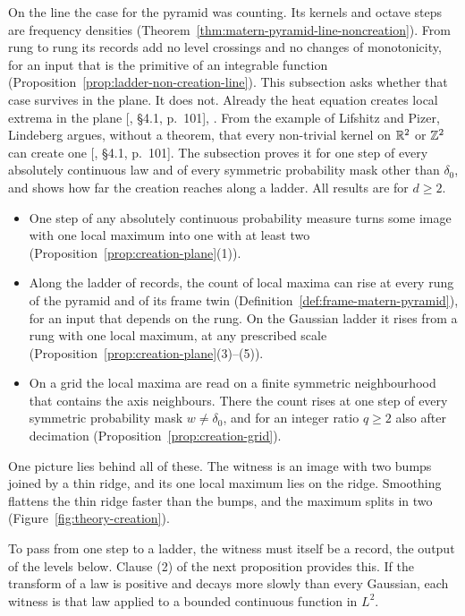 On the line the case for the \Matern{} pyramid was counting. Its kernels and octave steps are
\Polya{} frequency densities (Theorem~\ref{thm:matern-pyramid-line-noncreation}). From rung to rung
its records add no level crossings and no changes of monotonicity, for an input that is the
primitive of an integrable function (Proposition~\ref{prop:ladder-non-creation-line}). This
subsection asks whether that case survives in the plane. It does not. Already the heat equation
creates local extrema in the plane [, \S 4.1, p.~101],
. From the example of Lifshitz and Pizer, Lindeberg argues,
without a theorem, that every non-trivial kernel on $\mathbb{R}^2$ or $\mathbb{Z}^2$ can create one
[, \S 4.1, p.~101]. The subsection proves it for one step of every
absolutely continuous law and of every symmetric probability mask other than $\delta_0$, and shows
how far the creation reaches along a ladder. All results are for $d \ge 2$.
\begin{itemize}
\item One step of any absolutely continuous probability measure turns
some image with one local maximum into one with at least two
(Proposition~\ref{prop:creation-plane}(1)).
\item Along the ladder of records, the count of local maxima can rise at every rung of the
\Matern{} pyramid and of its frame twin (Definition~\ref{def:frame-matern-pyramid}), for an input
that depends on the rung. On the
Gaussian ladder it rises from a rung with one local maximum, at any prescribed scale
(Proposition~\ref{prop:creation-plane}(3)--(5)).
\item On a grid the local maxima are read on a finite symmetric neighbourhood that contains the axis
neighbours. There the count rises at one step of every symmetric probability mask
$w \ne \delta_0$, and for an integer ratio $q \ge 2$ also after decimation
(Proposition~\ref{prop:creation-grid}).
\end{itemize}

One picture lies behind all of these. The witness is an image with two bumps joined by a thin
ridge, and its one local maximum lies on the ridge. Smoothing flattens the thin ridge faster than
the bumps, and the maximum splits in two (Figure~\ref{fig:theory-creation}).

To pass from one step to a ladder, the witness must itself be a record, the output of the levels
below. Clause (2) of the next proposition provides this. If the transform of a law is positive and
decays more slowly than every Gaussian, each witness is that law applied to a bounded continuous
function in $L^2$.

